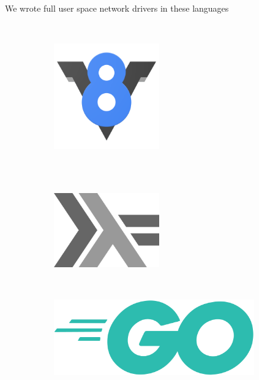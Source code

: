 \documentclass[NET,english,aspectratio=169,notitleframe]{tumbeamer}
\begin{document}
\begin{frame}{We wrote full user space network drivers in these languages}
\begin{figure}
\begin{subfigure}[t]{0.15\textwidth}
    \end{subfigure}
    ~
    \begin{subfigure}[t]{0.15\textwidth}
        \centering
	\vspace{-1.75cm}
        \includegraphics[width=0.50\textwidth]{pics/v8}
    \end{subfigure}
    \\
    \centering
    ~ 
    \begin{subfigure}[t]{0.2\columnwidth}
        \centering
        \includegraphics[width=0.5\textwidth]{pics/haskell}
    \end{subfigure}
    ~ 
    \begin{subfigure}[t]{0.2\columnwidth}
        \centering
        \includegraphics[width=0.95\textwidth]{pics/go}
    \end{subfigure}
    ~ 
    \begin{subfigure}[t]{0.2\columnwidth}

\end{subfigure}
\end{figure}
\end{frame}
\end{document}
